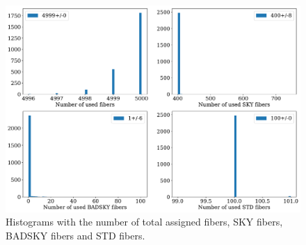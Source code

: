 \documentclass{article}
\begin{document}
\begin{figure}[!h]
\begin{center}
\begin{center}
\includegraphics[scale=0.40]{used_fibers.pdf}
\end{center}
\caption{
Histograms with the number of total assigned fibers, SKY fibers, 
BADSKY fibers and STD fibers.
\label{fig:used_fibers}}
\end{center}
\end{figure}
\end{document}
